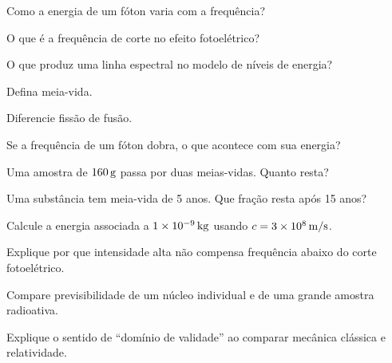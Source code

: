 \documentclass{notaaula}
\begin{document}
\begin{exercicios}
\begin{questoes}
\item Como a energia de um fóton varia com a frequência?
\item O que é a frequência de corte no efeito fotoelétrico?
\item O que produz uma linha espectral no modelo de níveis de energia?
\item Defina meia-vida.
\item Diferencie fissão de fusão.
\item Se a frequência de um fóton dobra, o que acontece com sua energia?
\item Uma amostra de $160\,\mathrm{g}$ passa por duas meias-vidas. Quanto resta?
\item Uma substância tem meia-vida de 5 anos. Que fração resta após 15 anos?
\item Calcule a energia associada a $1\times10^{-9}\,\mathrm{kg}$ usando $c=3\times10^8\,\mathrm{m/s}$.
\item Explique por que intensidade alta não compensa frequência abaixo do corte fotoelétrico.
\item Compare previsibilidade de um núcleo individual e de uma grande amostra radioativa.
\item Explique o sentido de ``domínio de validade'' ao comparar mecânica clássica e relatividade.
\end{questoes}
\end{exercicios}
\end{document}
